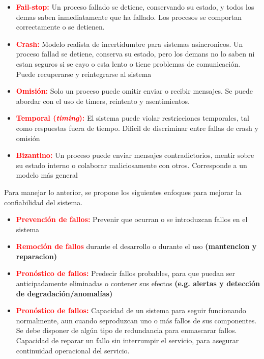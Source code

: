 \begin{itemize}
    \item \textcolor{red}{\textbf{Fail-stop:}} Un proceso fallado se detiene, conservando su estado, y todos los demas saben inmediatamente que ha fallado. Los procesos se comportan correctamente o se detienen.
    \item \textcolor{red}{\textbf{Crash:}} Modelo realista de incertidumbre para sistemas asincronicos. Un proceso fallad se detiene, conserva su estado, pero los demans no lo saben ni estan seguros si se cayo o esta lento o tiene problemas de comunicación. Puede recuperarse y reintegrarse al sistema
    \item \textcolor{red}{\textbf{Omisión:}} Solo un proceso puede omitir enviar o recibir mensajes. Se puede abordar con el uso de timers, reintento y asentimientos.
    \item \textcolor{red}{\textbf{Temporal (\textit{timing}):}} El sistema puede violar restricciones temporales, tal como respuestas fuera de tiempo. Dificil de discriminar entre fallas de crash y omisión
    \item \textcolor{red}{\textbf{Bizantino:}} Un proceso puede enviar mensajes contradictorios, mentir sobre su estado interno o colaborar maliciosamente con otros. Corresponde a un modelo más general
\end{itemize}

Para manejar lo anterior, se propone los siguientes enfoques para mejorar la confiabilidad del sistema.

\begin{itemize}
    \item \textcolor{red}{\textbf{Prevención de fallos:}} Prevenir que ocurran o se introduzcan fallos en el sistema
    \item \textcolor{red}{\textbf{Remoción de fallos}} durante el desarrollo o durante el uso \textbf{(mantencion y reparacion)}
    \item \textcolor{red}{\textbf{Pronóstico de fallos:}} Predecir fallos probables, para que puedan ser anticipadamente eliminadas o contener sus efectos \textbf{(e.g. alertas y detección de degradación/anomalías)}
    \item \textcolor{red}{\textbf{Pronóstico de fallos:}} Capacidad de un sistema para seguir funcionando normalmente, aun cuando seproduzcan uno o más fallos de sus componentes.
    \subitem Se debe disponer de algún tipo de redundancia para enmascarar fallos.
    \subitem Capacidad de reparar un fallo sin interrumpir el servicio, para asegurar continuidad operacional del servicio.
\end{itemize}
